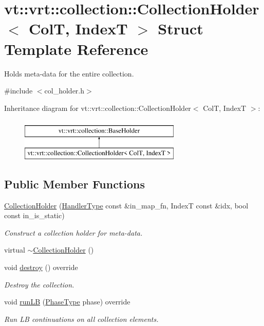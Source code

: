 \hypertarget{structvt_1_1vrt_1_1collection_1_1_collection_holder}{}\section{vt\+:\+:vrt\+:\+:collection\+:\+:Collection\+Holder$<$ ColT, IndexT $>$ Struct Template Reference}
\label{structvt_1_1vrt_1_1collection_1_1_collection_holder}


Holds meta-\/data for the entire collection.  




{\ttfamily \#include $<$col\+\_\+holder.\+h$>$}

Inheritance diagram for vt\+:\+:vrt\+:\+:collection\+:\+:Collection\+Holder$<$ ColT, IndexT $>$\+:\begin{figure}[H]
\begin{center}
\leavevmode
\includegraphics[height=2.000000cm]{structvt_1_1vrt_1_1collection_1_1_collection_holder}
\end{center}
\end{figure}
\subsection*{Public Member Functions}
\begin{DoxyCompactItemize}
\item 
\hyperlink{structvt_1_1vrt_1_1collection_1_1_collection_holder_a75bb95393ac580b3f330da43e295a47a}{Collection\+Holder} (\hyperlink{namespacevt_af64846b57dfcaf104da3ef6967917573}{Handler\+Type} const \&in\+\_\+map\+\_\+fn, IndexT const \&idx, bool const in\+\_\+is\+\_\+static)
\begin{DoxyCompactList}\small\item\em Construct a collection holder for meta-\/data. \end{DoxyCompactList}\item 
virtual \hyperlink{structvt_1_1vrt_1_1collection_1_1_collection_holder_a80360d38dc40e4bf2253288b01595de6}{$\sim$\+Collection\+Holder} ()
\item 
void \hyperlink{structvt_1_1vrt_1_1collection_1_1_collection_holder_a744d2a48f9f22db59b2705b3d3f3d1ca}{destroy} () override
\begin{DoxyCompactList}\small\item\em Destroy the collection. \end{DoxyCompactList}\item 
void \hyperlink{structvt_1_1vrt_1_1collection_1_1_collection_holder_a09a3f3e6ec221f36f3417713e64e8f69}{run\+LB} (\hyperlink{namespacevt_a46ce6733d5cdbd735d561b7b4029f6d7}{Phase\+Type} phase) override
\begin{DoxyCompactList}\small\item\em Run LB continuations on all collection elements. \end{DoxyCompactList}\end{DoxyCompactItemize}
